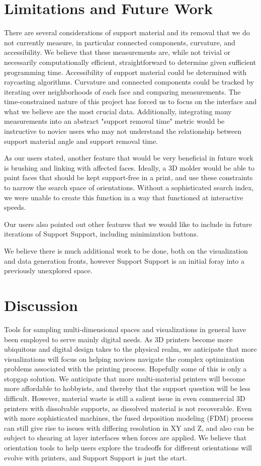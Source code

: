\documentclass{sigchi}
\begin{document}
\section{Limitations and Future Work}
There are several considerations of support material and its removal that we do not currently measure, in particular connected components, curvature, and accessibility.  We believe that these measurements are, while not trivial or necessarily computationally efficient, straightforward to determine given sufficient programming time.  Accessibility of support material could be determined with raycasting algorithms.  Curvature and connected components could be tracked by iterating over neighborhoods of each face and comparing measurements.  The time-constrained nature of this project has forced us to focus on the interface and what we believe are the most crucial data.  Additionally, integrating many measurements into an abstract "support removal time" metric would be instructive to novice users who may not understand the relationship between support material angle and support removal time.

As our users stated, another feature that would be very beneficial in future work is brushing and linking with affected faces.  Ideally, a 3D molder would be able to paint faces that should be kept support-free in a print, and use these constraints to narrow the search space of orientations.  Without a sophisticated search index, we were unable to create this function in a way that functioned at interactive speeds.

Our users also pointed out other features that we would like to include in future iterations of Support Support, including minimization buttons.

We believe there is much additional work to be done, both on the visualization and data generation fronts, however Support Support is an initial foray into a previously unexplored space.

\section{Discussion}
Tools for sampling multi-dimensional spaces and visualizations in general have been employed to serve mainly digital needs.  As 3D printers become more ubiquitous and digital design takes to the physical realm, we anticipate that more visualizations will focus on helping novices navigate the complex optimization problems associated with the printing process.  Hopefully some of this is only a stopgap solution.  We anticipate that more multi-material printers will become more affordable to hobbyists, and thereby that the support question will be less difficult.  However, material waste is still a salient issue in even commercial 3D printers with dissolvable supports, as dissolved material is not recoverable.  Even with more sophisticated machines, the fused deposition modeling (FDM) process can still give rise to issues with differing resolution in XY and Z, and also can be subject to shearing at layer interfaces when forces are applied.  We believe that orientation tools to help users explore the tradeoffs for different orientations will evolve with printers, and Support Support is just the start.
\end{document}
